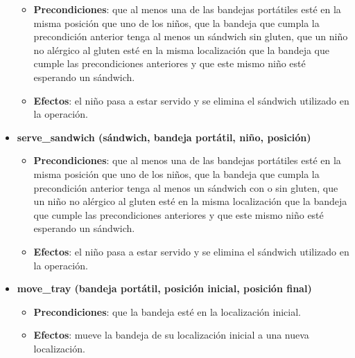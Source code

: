 \documentclass{article}
\begin{document}
\begin{itemize}
            \begin{itemize}
                \item \textbf{Precondiciones}: que al menos una de las bandejas portátiles esté
                en la misma posición que uno de los niños, que la bandeja que cumpla
                la precondición anterior tenga al menos un sándwich sin gluten, que
                un niño no alérgico al gluten esté en la misma localización que la
                bandeja que cumple las precondiciones anteriores y que este mismo niño esté esperando un sándwich.
                \item \textbf{Efectos}: el niño pasa a estar servido y se elimina el sándwich utilizado en la operación.
            \end{itemize}
        \item \textbf{serve\_sandwich (sándwich, bandeja portátil, niño, posición)}
            \begin{itemize}
                \item \textbf{Precondiciones}: que al menos una de las bandejas portátiles esté
                en la misma posición que uno de los niños, que la bandeja que cumpla la
                precondición anterior tenga al menos un sándwich con o sin gluten,
                que un niño no alérgico al gluten esté en la misma localización que la
                bandeja que cumple las precondiciones anteriores y que este mismo
                niño esté esperando un sándwich.
                \item \textbf{Efectos}: el niño pasa a estar servido y se elimina el sándwich
                utilizado en la operación.
            \end{itemize}
        \item \textbf{move\_tray (bandeja portátil, posición inicial, posición final)}
            \begin{itemize}
                \item \textbf{Precondiciones}: que la bandeja esté en la localización inicial.
                \item \textbf{Efectos}: mueve la bandeja de su localización inicial a una nueva
                localización.
            \end{itemize}
        
    \end{itemize}
    
\end{document}
